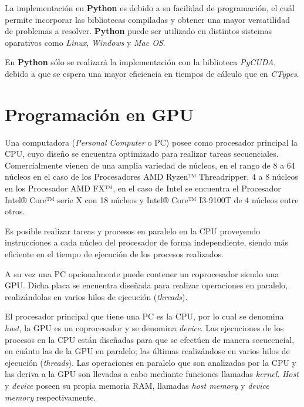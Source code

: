 La implementación en \textbf{Python} es debido a su facilidad de programación, el cuál permite incorporar las bibliotecas compiladas y obtener una mayor versatilidad de problemas a resolver. \textbf{Python} puede ser utilizado en distintos sistemas oparativos como \textit{Linux}, \textit{Windows} y \textit{Mac OS}. 

En \textbf{Python} sólo se realizará la implementación con la biblioteca \textit{PyCUDA}, debido a que se espera una mayor eficiencia en tiempos de cálculo que en \textit{CTypes}.




\section{Programación en GPU}

Una computadora (\textit{Personal Computer} o PC) posee como procesador principal la CPU, cuyo diseño se encuentra optimizado para realizar tareas secuenciales. Comercialmente vienen de una amplia variedad de núcleos, en el rango de 8 a 64 núcleos en el caso de los Procesadores AMD Ryzen™ Threadripper, 4 a 8 núcleos en los Procesador AMD FX™, en el caso de Intel se encuentra el Procesador Intel® Core™ serie X con 18 núcleos y  Intel® Core™ I3-9100T de 4 núcleos entre otros. \cite{edp:2020:amd} \cite{icp:2020:intel}

Es posible realizar tareas y procesos en paralelo en la CPU proveyendo instrucciones a cada núcleo del procesador de forma independiente, siendo más eficiente en el tiempo de ejecución de los procesos realizados.

A su vez una PC opcionalmente puede contener un coprocesador siendo una GPU. Dicha placa se encuentra diseñada para realizar operaciones en paralelo, realizándolas en varios hilos de ejecución (\textit{threads}).




El procesador principal que tiene una PC es la CPU, por lo cual se denomina \textit{host}, la GPU es un coprocesador y se denomina \textit{device}. Las ejecuciones de los procesos en la CPU están diseñadas para que se efectúen de manera secuecncial, en cuánto las de la GPU en paralelo; las últimas realizándose en varios hilos de ejecución (\textit{threads}). Las operaciones en paralelo que son analizadas por la CPU y las deriva a la GPU son llevadas a cabo mediante funciones llamadas \textit{kernel}. \textit{Host} y \textit{device} poseen su propia memoria RAM, llamadas \textit{host memory} y \textit{device memory} respectivamente. \cite{rinaldi2011modelos}

